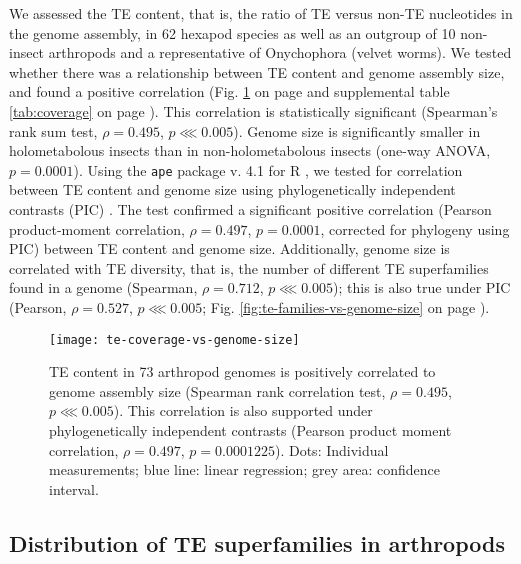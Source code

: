 We assessed the TE content, that is, the ratio of TE versus non-TE
nucleotides in the genome assembly, in 62 hexapod species as well as an
outgroup of 10 non-insect arthropods and a representative of Onychophora
(velvet worms). We tested whether there was a relationship between TE
content and genome assembly size, and found a positive correlation (Fig.
\ref{fig:te-coverage-vs-genome-size} on page
\pageref{fig:te-coverage-vs-genome-size} and supplemental table
\ref{tab:coverage} on page \pageref{tab:coverage}). This correlation is
statistically significant (Spearman's rank sum test, \(\rho = 0.495\),
\(p \lll 0.005\)). Genome size is significantly smaller in
holometabolous insects than in non-holometabolous insects (one-way
ANOVA, \(p = 0.0001\)). Using the \texttt{ape} package v. 4.1
\citep{Paradis2004} for R \citep{RCoreTeam2017}, we tested for
correlation between TE content and genome size using phylogenetically
independent contrasts (PIC) \citep{Felsenstein1985}. The test confirmed
a significant positive correlation (Pearson product-moment correlation,
\(\rho = 0.497\), \(p = 0.0001\), corrected for phylogeny using PIC)
between TE content and genome size. Additionally, genome size is
correlated with TE diversity, that is, the number of different TE
superfamilies found in a genome (Spearman, \(\rho = 0.712\), \(p \lll
0.005\)); this is also true under PIC (Pearson, \(\rho = 0.527\), \(p
\lll 0.005\); Fig. \ref{fig:te-families-vs-genome-size} on page
\pageref{fig:te-families-vs-genome-size}).

\begin{figure}[h!]
\begin{center}
\texttt{[image: te-coverage-vs-genome-size]}
\caption[TE content is correlated to genome size]{{TE content in 73 arthropod genomes is positively correlated to genome
assembly size (Spearman rank correlation test, \(\rho = 0.495\),
\(p \lll 0.005\)). This correlation is also supported under
phylogenetically independent contrasts \protect\citep{Felsenstein1985} (Pearson
product moment correlation, \(\rho = 0.497\), \(p = 0.0001225\)). Dots:
Individual measurements; blue line: linear regression; grey area:
confidence interval.%
}}%
\label{fig:te-coverage-vs-genome-size}%
\end{center}
\end{figure}

\subsection{Distribution of TE superfamilies in
arthropods}\label{distribution-of-te-superfamilies-in-arthropods}

